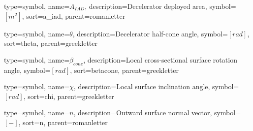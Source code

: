 {
type=symbol, %
name={\ensuremath{A_{IAD}}}, %
description={Decelerator deployed area}, %
symbol={$\left[m^2 \right]$}, %
sort=a_iad, %
parent=romanletter %
}

{
type=symbol, %
name={\ensuremath{\theta}}, %
description={Decelerator half-cone angle}, %
symbol={$\left[rad \right]$}, %
sort=theta, %
parent=greekletter %
}

{
	type=symbol, %
	name={\ensuremath{\beta_{cone}}}, %
	description={Local cross-sectional surface rotation angle}, %
	symbol={$\left[rad \right]$}, %
	sort=betacone, %
	parent=greekletter %
}

{
	type=symbol, %
	name={\ensuremath{\chi}}, %
	description={Local surface inclination angle}, %
	symbol={$\left[rad \right]$}, %
	sort=chi, %
	parent=greekletter %
}

{
	type=symbol, %
	name={\ensuremath{n}}, %
	description={Outward surface normal vector}, %
	symbol={$\left[- \right]$}, %
	sort=n, %
	parent=romanletter %
}

